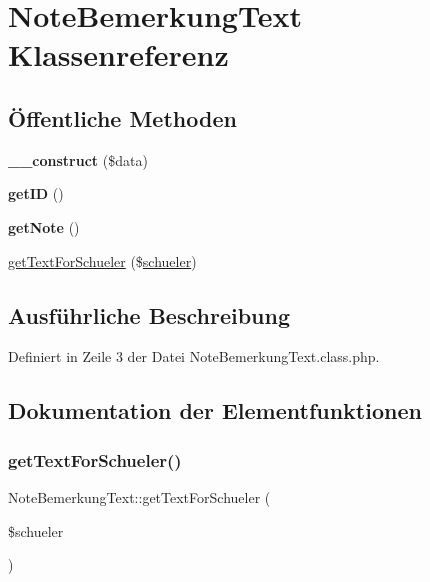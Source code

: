 \hypertarget{class_note_bemerkung_text}{}\section{Note\+Bemerkung\+Text Klassenreferenz}
\label{class_note_bemerkung_text}
\subsection*{Öffentliche Methoden}
\begin{DoxyCompactItemize}
\item 
\mbox{\label{class_note_bemerkung_text_af81399e4aecc9b934045185716f05dcb}} 
{\bfseries \+\_\+\+\_\+construct} (\$data)
\item 
\mbox{\label{class_note_bemerkung_text_a5d7f61650784a07ef9925d52cb2155b1}} 
{\bfseries get\+ID} ()
\item 
\mbox{\label{class_note_bemerkung_text_aac7d4fdbe5afcdf6d19ec7f926bdd742}} 
{\bfseries get\+Note} ()
\item 
\mbox{\hyperlink{class_note_bemerkung_text_a022580c7bee04587e2ec05997a721d08}{get\+Text\+For\+Schueler}} (\$\mbox{\hyperlink{classschueler}{schueler}})
\end{DoxyCompactItemize}


\subsection{Ausführliche Beschreibung}


Definiert in Zeile 3 der Datei Note\+Bemerkung\+Text.\+class.\+php.



\subsection{Dokumentation der Elementfunktionen}
\mbox{\label{class_note_bemerkung_text_a022580c7bee04587e2ec05997a721d08}} 
\subsubsection{\texorpdfstring{get\+Text\+For\+Schueler()}{getTextForSchueler()}}
{\footnotesize\ttfamily Note\+Bemerkung\+Text\+::get\+Text\+For\+Schueler (\begin{DoxyParamCaption}\item[{}]{\$schueler }\end{DoxyParamCaption})}


